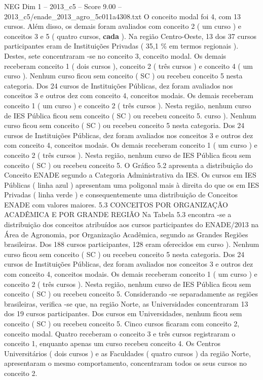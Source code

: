 \begin{textsample}{NEG Dim 1 – 2013\_c5 – Score 9.00 – 2013\_c5/enade\_2013\_agro\_5c011a4308.txt}
O conceito modal foi 4, com 13 cursos.
Além disso, os demais foram avaliados com conceito 2 ( um curso ) e conceitos 3 e 5 ( quatro cursos, \textbf{cada} ).
Na região Centro-Oeste, 13 dos 37 cursos participantes eram de Instituições Privadas ( 35,1 \% em termos regionais ).
Destes, sete concentraram -se no conceito 3, conceito modal.
Os demais receberam conceito 1 ( dois cursos ), conceito 2 ( três cursos ) e conceito 4 ( um curso ).
Nenhum curso ficou sem conceito ( SC ) ou recebeu conceito 5 nesta categoria.
Dos 24 cursos de Instituições Públicas, dez foram avaliados nos conceitos 3 e outros dez com conceito 4, conceitos modais.
Os demais receberam conceito 1 ( um curso ) e conceito 2 ( três cursos ).
Nesta região, nenhum curso de IES Pública ficou sem conceito ( SC ) ou recebeu conceito 5. curso ).
Nenhum curso ficou sem conceito ( SC ) ou recebeu conceito 5 nesta categoria.
Dos 24 cursos de Instituições Públicas, dez foram avaliados nos conceitos 3 e outros dez com conceito 4, conceitos modais.
Os demais receberam conceito 1 ( um curso ) e conceito 2 ( três cursos ).
Nesta região, nenhum curso de IES Pública ficou sem conceito ( SC ) ou recebeu conceito 5.
O Gráfico 5.2 apresenta a distribuição do Conceito ENADE segundo a Categoria Administrativa da IES.
Os cursos em IES Públicas ( linha azul ) apresentam uma poligonal mais à direita do que os em IES Privadas ( linha verde ) e consequentemente uma distribuição de Conceitos ENADE com valores maiores. 5.3 CONCEITOS POR ORGANIZAÇÃO ACADÊMICA E POR GRANDE REGIÃO Na Tabela 5.3 encontra -se a distribuição dos conceitos atribuídos aos cursos participantes do ENADE/2013 na Área de Agronomia, por Organização Acadêmica, segundo as Grandes Regiões brasileiras.
Dos 188 cursos participantes, 128 eram oferecidos em curso ).
Nenhum curso ficou sem conceito ( SC ) ou recebeu conceito 5 nesta categoria.
Dos 24 cursos de Instituições Públicas, dez foram avaliados nos conceitos 3 e outros dez com conceito 4, conceitos modais.
Os demais receberam conceito 1 ( um curso ) e conceito 2 ( três cursos ).
Nesta região, nenhum curso de IES Pública ficou sem conceito ( SC ) ou recebeu conceito 5.
Considerando -se separadamente as regiões brasileiras, verifica -se que, na região Norte, as Universidades concentraram 13 dos 19 cursos participantes.
Dos cursos em Universidades, nenhum ficou sem conceito ( SC ) ou recebeu conceito 5.
Cinco cursos ficaram com conceito 2, conceito modal.
Quatro receberam o conceito 3 e três cursos registraram o conceito 1, enquanto apenas um curso recebeu conceito 4.
Os Centros Universitários ( dois cursos ) e as Faculdades ( quatro cursos ) da região Norte, apresentaram o mesmo comportamento, concentraram todos os seus cursos no conceito 2.

\end{textsample}
